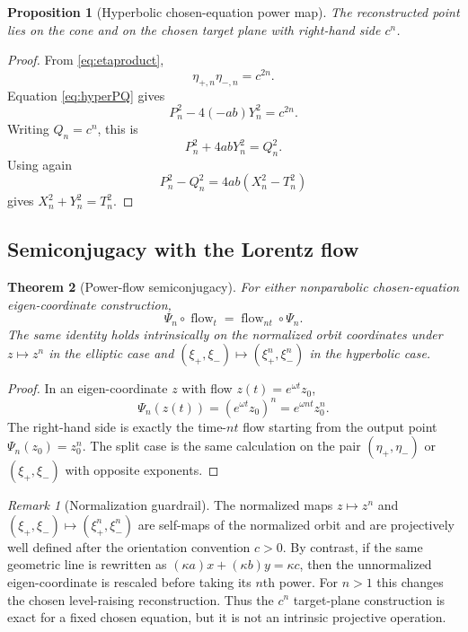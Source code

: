 \documentclass[11pt]{amsart}
\newtheorem{theorem}{Theorem}[section]
\newtheorem{proposition}[theorem]{Proposition}
\theoremstyle{remark}
\newtheorem*{remark}{Remark}
\begin{document}
\begin{proposition}[Hyperbolic chosen-equation power map]\label{prop:hyppower}
The reconstructed point lies on the cone and on the chosen target plane with right-hand side $c^n$.
\end{proposition}

\begin{proof}
From \eqref{eq:etaproduct},
\[
\eta_{+,n}\eta_{-,n}=c^{2n}.
\]
Equation \eqref{eq:hyperPQ} gives
\[
P_n^2-4(-ab)Y_n^2=c^{2n}.
\]
Writing $Q_n=c^n$, this is
\[
P_n^2+4abY_n^2=Q_n^2.
\]
Using again
\[
P_n^2-Q_n^2=4ab(X_n^2-T_n^2)
\]
gives $X_n^2+Y_n^2=T_n^2$.
\end{proof}

\subsection{Semiconjugacy with the Lorentz flow}

\begin{theorem}[Power-flow semiconjugacy]\label{thm:semiconj}
For either nonparabolic chosen-equation eigen-coordinate construction,
\begin{equation}\label{eq:semiconj}
\boxed{
\Psi_n\circ\operatorname{flow}_t
=\operatorname{flow}_{nt}\circ\Psi_n.
}
\end{equation}
The same identity holds intrinsically on the normalized orbit coordinates under $z\mapsto z^n$ in the elliptic case and $(\xi_+,\xi_-)\mapsto(\xi_+^n,\xi_-^n)$ in the hyperbolic case.
\end{theorem}

\begin{proof}
In an eigen-coordinate $z$ with flow $z(t)=e^{\omega t}z_0$,
\[
\Psi_n(z(t))=(e^{\omega t}z_0)^n=e^{\omega nt}z_0^n.
\]
The right-hand side is exactly the time-$nt$ flow starting from the output point $\Psi_n(z_0)=z_0^n$.  The split case is the same calculation on the pair $(\eta_+,\eta_-)$ or $(\xi_+,\xi_-)$ with opposite exponents.
\end{proof}

\begin{remark}[Normalization guardrail]
The normalized maps $z\mapsto z^n$ and $(\xi_+,\xi_-)\mapsto(\xi_+^n,\xi_-^n)$ are self-maps of the normalized orbit and are projectively well defined after the orientation convention $c>0$.  By contrast, if the same geometric line is rewritten as $(\kappa a)x+(\kappa b)y=\kappa c$, then the unnormalized eigen-coordinate is rescaled before taking its $n$th power.  For $n>1$ this changes the chosen level-raising reconstruction.  Thus the $c^n$ target-plane construction is exact for a fixed chosen equation, but it is not an intrinsic projective operation.
\end{remark}
\end{document}
